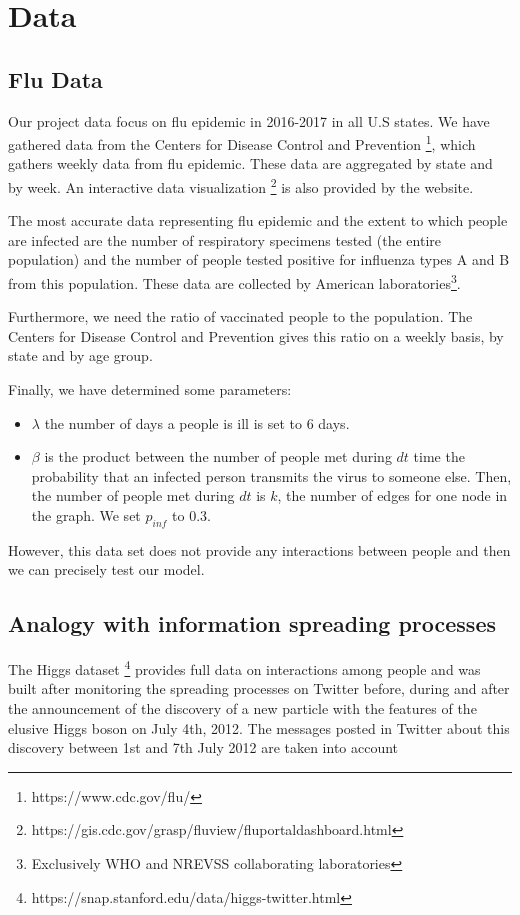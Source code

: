 \section{Data}
\subsection{Flu Data}

Our project data focus on flu epidemic in 2016-2017 in all U.S states.
 We have gathered data from the Centers for Disease Control and Prevention \footnote{https://www.cdc.gov/flu/}, which gathers weekly data from flu epidemic. These data are aggregated by state and by week.
 An interactive data visualization \footnote{https://gis.cdc.gov/grasp/fluview/fluportaldashboard.html} is also provided by the website.
 
 The most accurate data representing flu epidemic and the extent to which people are infected are the number of respiratory specimens tested (the entire population) and the number of people tested positive for influenza types A and B from this population.
 These data are collected by American laboratories\footnote{Exclusively WHO and NREVSS collaborating laboratories}.
 
 Furthermore, we need the ratio of vaccinated people to the population. The Centers for Disease Control and Prevention gives this ratio on a weekly basis, by state and by age group.
 
 Finally, we have determined some parameters:
 \begin{itemize}
     \item $\lambda$ the number of days a people is ill is set to 6 days.
     \item $\beta$ is the product between the number of people met during $dt$ time the probability that an infected person transmits the virus to someone else. Then, the number of people met during $dt$ is $k$, the number of edges for one node in the graph. We set $p_{inf}$ to 0.3.
\end{itemize}

However, this data set does not provide any interactions between people and then we can precisely test our model.

\subsection{Analogy with information spreading processes}

The Higgs dataset \footnote{https://snap.stanford.edu/data/higgs-twitter.html}
provides full data on interactions among people and was built after monitoring the spreading processes on Twitter before, during and after the announcement of the discovery of a new particle with the features of the elusive Higgs boson on July 4th, 2012. The messages posted in Twitter about this discovery between 1st and 7th July 2012 are taken into account

